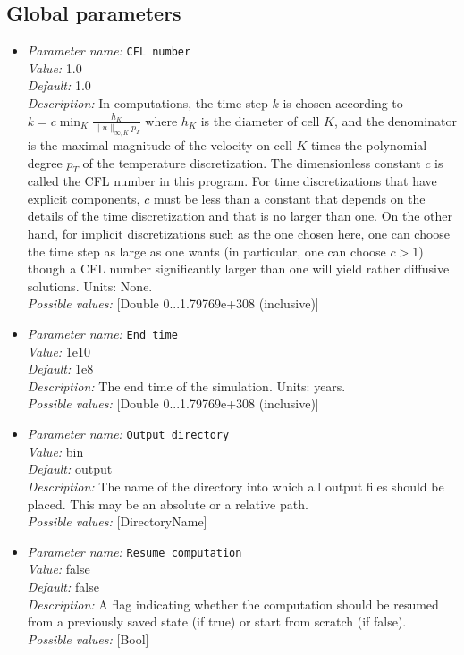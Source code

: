 \subsection{Global parameters}

\begin{itemize}
\item {\it Parameter name:} {\tt CFL number}\\
{\it Value:} 1.0\\
{\it Default:} 1.0\\
{\it Description:} In computations, the time step $k$ is chosen according to $k = c \min_K \frac{h_K}{\|u\|_{\infty,K} p_T}$ where $h_K$ is the diameter of cell $K$, and the denominator is the maximal magnitude of the velocity on cell $K$ times the polynomial degree $p_T$ of the temperature discretization. The dimensionless constant $c$ is called the CFL number in this program. For time discretizations that have explicit components, $c$ must be less than a constant that depends on the details of the time discretization and that is no larger than one. On the other hand, for implicit discretizations such as the one chosen here, one can choose the time step as large as one wants (in particular, one can choose $c>1$) though a CFL number significantly larger than one will yield rather diffusive solutions. Units: None.\\
{\it Possible values:} [Double 0...1.79769e+308 (inclusive)]
\item {\it Parameter name:} {\tt End time}\\
{\it Value:} 1e10\\
{\it Default:} 1e8\\
{\it Description:} The end time of the simulation. Units: years.\\
{\it Possible values:} [Double 0...1.79769e+308 (inclusive)]
\item {\it Parameter name:} {\tt Output directory}\\
{\it Value:} bin\\
{\it Default:} output\\
{\it Description:} The name of the directory into which all output files should be placed. This may be an absolute or a relative path.\\
{\it Possible values:} [DirectoryName]
\item {\it Parameter name:} {\tt Resume computation}\\
{\it Value:} false\\
{\it Default:} false\\
{\it Description:} A flag indicating whether the computation should be resumed from a previously saved state (if true) or start from scratch (if false).\\
{\it Possible values:} [Bool]
\end{itemize}



